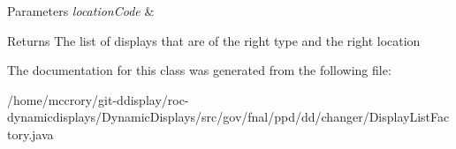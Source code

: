 \begin{DoxyParams}{Parameters}
{\em location\-Code} & \\
\hline
\end{DoxyParams}
\begin{DoxyReturn}{Returns}
The list of displays that are of the right type and the right location 
\end{DoxyReturn}


The documentation for this class was generated from the following file\-:\begin{DoxyCompactItemize}
\item 
/home/mccrory/git-\/ddisplay/roc-\/dynamicdisplays/\-Dynamic\-Displays/src/gov/fnal/ppd/dd/changer/Display\-List\-Factory.\-java\end{DoxyCompactItemize}
